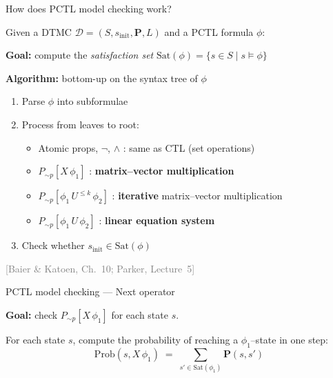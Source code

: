 \documentclass[dvipsnames]{beamer}
\begin{document}
\begin{frame}{How does PCTL model checking work?}

    Given a DTMC $\mathcal{D} = (S, s_{\text{init}}, \mathbf{P}, L)$
    and a PCTL formula $\phi$:

    \vspace{1em}

    \textbf{Goal:} compute the \emph{satisfaction set}
    $\mathrm{Sat}(\phi) = \{s \in S \mid s \models \phi\}$

    \vspace{1em}

    \textbf{Algorithm:} bottom-up on the syntax tree of $\phi$
    \begin{enumerate}
        \item Parse $\phi$ into subformulae
        \item Process from leaves to root:
              \begin{itemize}
                  \item Atomic props, $\lnot$, $\land$ \;:\;
                        same as CTL (set operations)
                  \item $P_{\sim p}[X\,\phi_1]$ \;:\;
                        \textbf{matrix--vector multiplication}
                  \item $P_{\sim p}[\phi_1\, U^{\leq k}\, \phi_2]$ \;:\;
                        \textbf{iterative} matrix--vector multiplication
                  \item $P_{\sim p}[\phi_1\, U\, \phi_2]$ \;:\;
                        \textbf{linear equation system}
              \end{itemize}
        \item Check whether $s_{\text{init}} \in \mathrm{Sat}(\phi)$
    \end{enumerate}

    \vspace{0.5em}
    \hfill{\scriptsize\textcolor{gray}{[Baier \& Katoen, Ch.~10; Parker, Lecture~5]}}
\end{frame}

\begin{frame}{PCTL model checking --- Next operator}

    \textbf{Goal:} check $P_{\sim p}[X\,\phi_1]$ for each state $s$.

    \vspace{0.5em}
    For each state $s$, compute the probability of reaching
    a $\phi_1$--state in one step:
    \[
        \mathrm{Prob}(s, X\,\phi_1)
        \;=\;
        \sum_{s' \in \mathrm{Sat}(\phi_1)} \mathbf{P}(s, s')
    \]

\end{frame}
\end{document}
